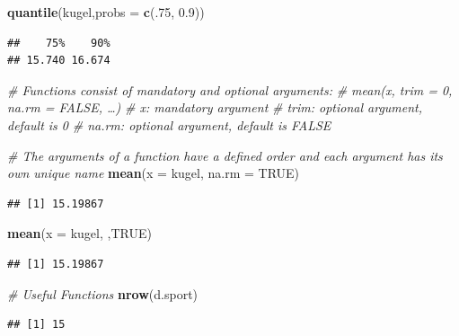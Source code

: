\documentclass[
]{article}
\newenvironment{Shaded}{\begin{snugshade}}{\end{snugshade}}
\newcommand{\AttributeTok}[1]{\textcolor[rgb]{0.13,0.29,0.53}{#1}}
\newcommand{\CommentTok}[1]{\textcolor[rgb]{0.56,0.35,0.01}{\textit{#1}}}
\newcommand{\ConstantTok}[1]{\textcolor[rgb]{0.56,0.35,0.01}{#1}}
\newcommand{\DecValTok}[1]{\textcolor[rgb]{0.00,0.00,0.81}{#1}}
\newcommand{\FloatTok}[1]{\textcolor[rgb]{0.00,0.00,0.81}{#1}}
\newcommand{\FunctionTok}[1]{\textcolor[rgb]{0.13,0.29,0.53}{\textbf{#1}}}
\newcommand{\NormalTok}[1]{#1}
\begin{document}
\begin{Shaded}
\begin{Highlighting}[]
\FunctionTok{quantile}\NormalTok{(kugel,}\AttributeTok{probs =} \FunctionTok{c}\NormalTok{(.}\DecValTok{75}\NormalTok{, }\FloatTok{0.9}\NormalTok{))}
\end{Highlighting}
\end{Shaded}

\begin{verbatim}
##    75%    90% 
## 15.740 16.674
\end{verbatim}

\begin{Shaded}
\begin{Highlighting}[]
\CommentTok{\# Functions consist of mandatory and optional arguments:}
  \CommentTok{\# mean(x, trim = 0, na.rm = FALSE, …)}
  \CommentTok{\# x: mandatory argument}
  \CommentTok{\# trim: optional argument, default is 0}
  \CommentTok{\# na.rm: optional argument, default is FALSE}

\CommentTok{\# The arguments of a function have a defined order and each argument has its own unique name}
\FunctionTok{mean}\NormalTok{(}\AttributeTok{x =}\NormalTok{ kugel, }\AttributeTok{na.rm =} \ConstantTok{TRUE}\NormalTok{)}
\end{Highlighting}
\end{Shaded}

\begin{verbatim}
## [1] 15.19867
\end{verbatim}

\begin{Shaded}
\begin{Highlighting}[]
\FunctionTok{mean}\NormalTok{(}\AttributeTok{x =}\NormalTok{ kugel, ,}\ConstantTok{TRUE}\NormalTok{)}
\end{Highlighting}
\end{Shaded}

\begin{verbatim}
## [1] 15.19867
\end{verbatim}

\begin{Shaded}
\begin{Highlighting}[]
\CommentTok{\# Useful Functions}
\FunctionTok{nrow}\NormalTok{(d.sport)}
\end{Highlighting}
\end{Shaded}

\begin{verbatim}
## [1] 15
\end{verbatim}
\end{document}

